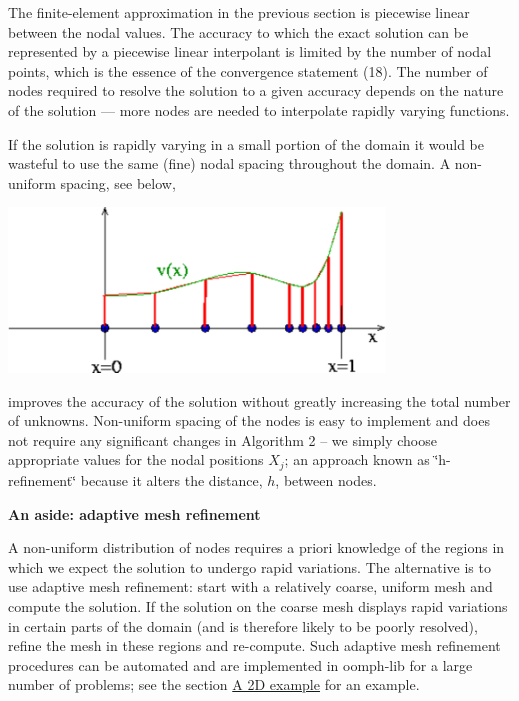 The finite-\/element approximation in the previous section is piecewise linear between the nodal values. The accuracy to which the exact solution can be represented by a piecewise linear interpolant is limited by the number of nodal points, which is the essence of the convergence statement (18). The number of nodes required to resolve the solution to a given accuracy depends on the nature of the solution --- more nodes are needed to interpolate rapidly varying functions.

If the solution is rapidly varying in a small portion of the domain it would be wasteful to use the same (fine) nodal spacing throughout the domain. A non-\/uniform spacing, see below,  
\begin{DoxyImage}
\includegraphics[width=0.75\textwidth]{fe_adaptive_interpolant}
\caption{Adaptive 1\-D finite element mesh\-: Non-\/uniform spacing of nodes to achieve a high resolution only where it is required. }
\end{DoxyImage}
 improves the accuracy of the solution without greatly increasing the total number of unknowns. Non-\/uniform spacing of the nodes is easy to implement and does not require any significant changes in Algorithm 2 -- we simply choose appropriate values for the nodal positions $ X_j $; an approach known as \char`\"{}h-\/refinement\char`\"{} because it alters the distance, $ h $, between nodes.

\begin{TabularC}{1}
\hline
\begin{center}{\bfseries  An aside\-: adaptive mesh refinement }\end{center}  A non-\/uniform distribution of nodes requires a priori knowledge of the regions in which we expect the solution to undergo rapid variations. The alternative is to use adaptive mesh refinement\-: start with a relatively coarse, uniform mesh and compute the solution. If the solution on the coarse mesh displays rapid variations in certain parts of the domain (and is therefore likely to be poorly resolved), refine the mesh in these regions and re-\/compute. Such adaptive mesh refinement procedures can be automated and are implemented in {\ttfamily oomph-\/lib} for a large number of problems; see the section \hyperlink{index_example_P2}{A 2\-D example} for an example.   \\
\end{TabularC}


